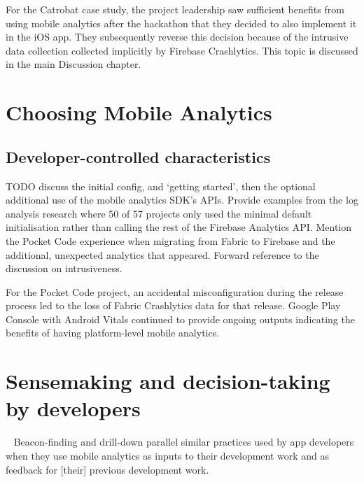 For the Catrobat case study, the project leadership saw sufficient benefits from using mobile analytics after the hackathon that they decided to also implement it in the iOS app. They subsequently reverse this decision because of the intrusive data collection collected implicitly by Firebase Crashlytics. This topic is discussed in the main Discussion chapter.

\section{Choosing Mobile Analytics}

\subsection{Developer-controlled characteristics}

TODO discuss the initial config, and `getting started', then the optional additional use of the mobile analytics SDK's APIs. Provide examples from the log analysis research where 50 of 57 projects only used the minimal default initialisation rather than calling the rest of the Firebase Analytics API. Mention the Pocket Code experience when migrating from Fabric to Firebase and the additional, unexpected analytics that appeared. Forward reference to the discussion on intrusiveness. 


For the Pocket Code project, an accidental misconfiguration during the release process led to the loss of Fabric Crashlytics data for that release. Google Play Console with Android Vitals continued to provide ongoing outputs indicating the benefits of having platform-level mobile analytics.

\section{Sensemaking and decision-taking by developers}~\label{sensemaking-and-decision-taking-by-developers-section}
Beacon-finding and drill-down parallel similar practices used by app developers when they use mobile analytics as inputs to their development work and as feedback for [their] previous development work.

